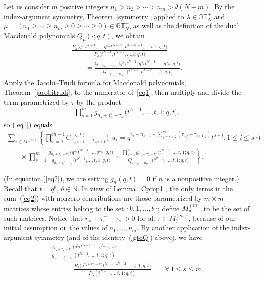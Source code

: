 \documentclass[pdftex]{sigma}
\numberwithin{equation}{section}
\newcommand{\N}{\mathbb{N}}
\newcommand{\GTp}{\mathbb{GT}^+}
\begin{document}
Let us consider $m$ positive integers $n_1 > n_2 > \cdots > n_m > \theta (N + m)$. By the index-argument symmetry, Theorem~\ref{symmetry}, applied to $\lambda\in\GTp_N$ and $\mu = (n_1 \geq \cdots \geq n_m \geq 0 \geq \cdots \geq 0)\in\GTp_N$, as well as the def\/inition of the dual Macdonald polynomials $Q_{\mu}(\cdot; q, t)$, we obtain
\begin{gather}
\frac{P_{\lambda}\big(q^{n_1}t^{N-1}, \dots, q^{n_m}t^{N-m}, t^{N-m-1}, \dots, t, 1; q, t\big)}{P_{\lambda}\big(t^{N-1}, t^{N-2}, \dots, 1; q, t\big)} \nonumber\\
\qquad {}= \frac{Q_{(n_1, \dots, n_m)}\big(q^{\lambda_1}t^{N-1}, q^{\lambda_2}t^{N-2}, \dots, q^{\lambda_N}; q, t\big)}{Q_{(n_1, \dots, n_m)}\big(t^{N-1}, t^{N-2}, \dots, 1; q, t\big)}.\label{eq1}
\end{gather}
Apply the Jacobi--Trudi formula for Macdonald polynomials, Theorem~\ref{jacobitrudi}, to the numerator of~\eqref{eq1}, then multiply and divide the term parametrized by $\tau$ by the product
\begin{gather*}
\prod_{s=1}^m{{g_{n_s+\tau_s^+ - \tau_s^-}\big(t^{N-1}, \dots, t, 1; q, t\big)}},
\end{gather*} so (\ref{eq1}) equals
\begin{gather}
\sum_{\tau\in M^{(m)}}\left\{\prod_{s=1}^{m-1}{C^{(q, t)}_{\tau_{1, s+1}, \dots, \tau_{s, s+1}}\Big(\Big\{ u_i = q^{n_i - n_{s+1} + \sum\limits_{j=s+2}^m{(\tau_{i, j} - \tau_{s+1, j})}}t^{s-i}\colon 1\leq i\leq s\Big\}\Big)} \right.\nonumber\\
\left.{} \qquad{} \times\prod_{s=1}^m{\frac{g_{n_s + \tau_s^+ - \tau_s^-}\big(q^{\lambda_1} t^{N-1}, \dots, q^{\lambda_N}; q, t\big)}{g_{n_s + \tau_s^+ - \tau_s^-}\big(t^{N-1}, \dots, t, 1; q, t\big)}} \times \frac{\prod\limits_{s=1}^m{g_{n_s + \tau_s^+ - \tau_s^-}\big(t^{N-1}, \dots, t, 1; q, t\big)}}{Q_{(n_1, \dots, n_m)}\big(t^{N-1}, \dots, t, 1; q, t\big)} \right\}.\!\!\!\!\label{eq2}
\end{gather}

(In equation (\ref{eq2}), we are setting $g_n(q, t) = 0$ if $n$ is a nonpositive integer.) Recall that $t = q^{\theta}$, $\theta\in\N$. In view of Lemma~\ref{Cprop1}, the only terms in the sum~(\ref{eq2}) with nonzero contributions are those parametrized by $m\times m$ matrices whose entries belong to the set $\{0, 1, \dots, \theta\}$; def\/ine $M^{(m)}_{\theta}$ to be the set of such matrices. Notice that $n_s + \tau_s^+ - \tau_s^- > 0$ for all $\tau\in M_{\theta}^{(m)}$, because of our initial assumption on the values of $n_1, \dots, n_m$. By another application of the index-argument symmetry (and of the identity~(\ref{gtoQ}) above), we have
\begin{gather}\label{eq33}
\frac{g_{n_s + \tau_s^+ - \tau_s^+}\big(q^{\lambda_1}t^{N-1}, \dots, q^{\lambda_N}; q, t\big)}{g_{n_s + \tau_s^+ - \tau_s^-}(t^{N-1}, \dots, t, 1; q, t)}\nonumber\\
\qquad {} = \frac{P_{\lambda}\big(q^{n_s + \tau_s^+ - \tau_s^-} t^{N-1}, t^{N-2}, \dots, t, 1; q, t\big)}{P_{\lambda}(t^{N-1}, \dots, t, 1; q, t)} \qquad \forall\, 1\leq s\leq m.
\end{gather}
\end{document}
